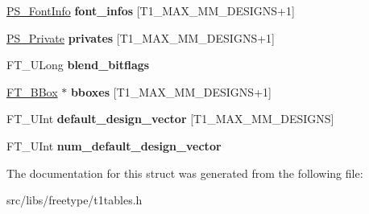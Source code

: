 \begin{DoxyCompactItemize}
\item 
\hypertarget{struct_p_s___blend_rec___ac5478cafc838257e693a9604edf1f5e9}{
\hyperlink{struct_p_s___font_info_rec__}{PS\_\-FontInfo} {\bfseries font\_\-infos} \mbox{[}T1\_\-MAX\_\-MM\_\-DESIGNS+1\mbox{]}}
\label{struct_p_s___blend_rec___ac5478cafc838257e693a9604edf1f5e9}

\item 
\hypertarget{struct_p_s___blend_rec___a2b6e0c48d7a9c350b09f2943c1779ea4}{
\hyperlink{struct_p_s___private_rec__}{PS\_\-Private} {\bfseries privates} \mbox{[}T1\_\-MAX\_\-MM\_\-DESIGNS+1\mbox{]}}
\label{struct_p_s___blend_rec___a2b6e0c48d7a9c350b09f2943c1779ea4}

\item 
\hypertarget{struct_p_s___blend_rec___a86caa5319e208b4a2057db656bad9221}{
FT\_\-ULong {\bfseries blend\_\-bitflags}}
\label{struct_p_s___blend_rec___a86caa5319e208b4a2057db656bad9221}

\item 
\hypertarget{struct_p_s___blend_rec___a30845d3cbd2e95a5f9cc867c7226af5e}{
\hyperlink{struct_f_t___b_box__}{FT\_\-BBox} $\ast$ {\bfseries bboxes} \mbox{[}T1\_\-MAX\_\-MM\_\-DESIGNS+1\mbox{]}}
\label{struct_p_s___blend_rec___a30845d3cbd2e95a5f9cc867c7226af5e}

\item 
\hypertarget{struct_p_s___blend_rec___a3ddacbda91fe0f9ef934a9e0afa6286f}{
FT\_\-UInt {\bfseries default\_\-design\_\-vector} \mbox{[}T1\_\-MAX\_\-MM\_\-DESIGNS\mbox{]}}
\label{struct_p_s___blend_rec___a3ddacbda91fe0f9ef934a9e0afa6286f}

\item 
\hypertarget{struct_p_s___blend_rec___afa5c7dd4206eb8a1d9ef4894abfc9555}{
FT\_\-UInt {\bfseries num\_\-default\_\-design\_\-vector}}
\label{struct_p_s___blend_rec___afa5c7dd4206eb8a1d9ef4894abfc9555}

\end{DoxyCompactItemize}


The documentation for this struct was generated from the following file:\begin{DoxyCompactItemize}
\item 
src/libs/freetype/t1tables.h\end{DoxyCompactItemize}
